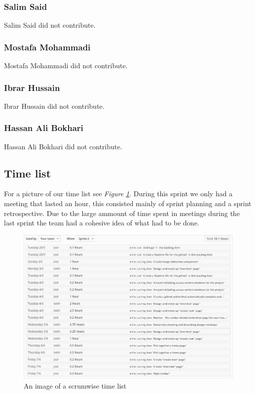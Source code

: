 \documentclass[12pt]{article}
\begin{document}
\subsubsection{Salim Said}
Salim Said did not contribute.
\subsubsection{Mostafa Mohammadi}
Mostafa Mohammadi did not contribute.
\subsubsection{Ibrar Hussain}
Ibrar Hussain did not contribute.
\subsubsection{Hassan Ali Bokhari}
Hassan Ali Bokhari did not contribute.

\subsection{Time list}

For a picture of our time list see \textit{Figure \ref{fig:TL}}. During this sprint we only had a meeting that lasted an hour, this consisted mainly of sprint planning and a sprint retrospective.
Due to the large ammount of time spent in meetings during the last sprint the team had a cohesive idea of what had to be done.
\begin{figure}[h]
    \begin{adjustwidth}{-1in}{-1in}
        \centering
        \includegraphics[scale=0.5]{timelist.png}
        \caption{An image of a scrumwise time list}
        \label{fig:TL}
    \end{adjustwidth}
\end{figure}
\clearpage
\end{document}
